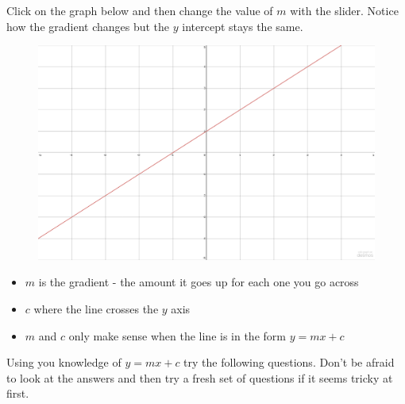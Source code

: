 \documentclass[
  a4paper,
]{scrbook}
\providecommand{\tightlist}{%
  \setlength{\itemsep}{0pt}\setlength{\parskip}{0pt}}\usepackage{longtable,booktabs,array}
\begin{document}
Click on the graph below and then change the value of \(m\) with the
slider. Notice how the gradient changes but the \(y\) intercept stays
the same.

\begin{figure}

{\centering 

\href{https://www.desmos.com/calculator/z9r3fkyrcf?embed}{\includegraphics{./06-straight_line_graphs_files/figure-pdf/unnamed-chunk-6-1.png}}

}

\end{figure}

\begin{tcolorbox}[enhanced jigsaw, opacityback=0, left=2mm, toptitle=1mm, title=\textcolor{quarto-callout-note-color}{\faInfo}\hspace{0.5em}{Note}, breakable, colbacktitle=quarto-callout-note-color!10!white, opacitybacktitle=0.6, bottomtitle=1mm, arc=.35mm, colback=white, leftrule=.75mm, bottomrule=.15mm, colframe=quarto-callout-note-color-frame, rightrule=.15mm, titlerule=0mm, toprule=.15mm, coltitle=black]

\begin{itemize}
\tightlist
\item
  \(m\) is the gradient - the amount it goes up for each one you go
  across
\item
  \(c\) where the line crosses the \(y\) axis
\item
  \(m\) and \(c\) only make sense when the line is in the form
  \(y=mx+c\)
\end{itemize}

\end{tcolorbox}

Using you knowledge of \(y=mx+c\) try the following questions. Don't be
afraid to look at the answers and then try a fresh set of questions if
it seems tricky at first.
\end{document}
